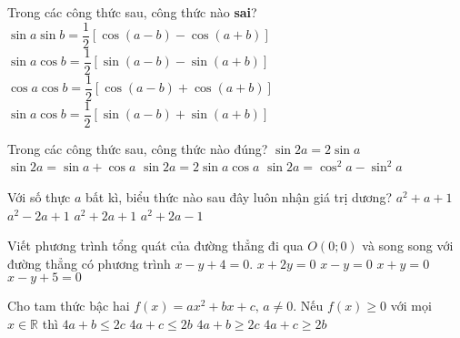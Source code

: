 \begin{ex}%
Trong các công thức sau, công thức nào {\bf sai}?
\choice
{$\sin a\sin b=\dfrac{1}{2}\left[\cos(a-b)-\cos(a+b)\right]$}
{\True $\sin a\cos b=\dfrac{1}{2}\left[\sin(a-b)-\sin(a+b)\right]$}
{$\cos a\cos b=\dfrac{1}{2}\left[\cos(a-b)+\cos(a+b)\right]$}
{$\sin a\cos b=\dfrac{1}{2}\left[\sin(a-b)+\sin(a+b)\right]$}	
\end{ex}

\begin{ex}%
Trong các công thức sau, công thức nào đúng?
\choice
{$\sin2a=2\sin a$}
{$\sin2a=\sin a+\cos a$}
{\True $\sin2a=2\sin a\cos a$}
{$\sin2a=\cos^2a-\sin^2a$}
\end{ex}

\begin{ex}%
Với số thực $a$ bất kì, biểu thức nào sau đây luôn nhận giá trị dương?
\choice
{\True $a^2+a+1$}
{$a^2-2a+1$}
{$a^2+2a+1$}
{$a^2+2a-1$}
	
\end{ex}

\begin{ex}%
Viết phương trình tổng quát của đường thẳng đi qua $O(0;0)$ và song song với đường thẳng có phương trình $x-y+4=0$.
\choice
{$x+2y=0$}
{\True $x-y=0$}
{$x+y=0$}
{$x-y+5=0$}
\end{ex}

\begin{ex}%
Cho tam thức bậc hai $f(x)=ax^2+bx+c,\, a\ne 0$. Nếu $f(x)\ge 0$ với mọi $x\in\mathbb{R}$ thì
\choice
{$4a+b\le 2c$}
{$4a+c\le 2b$}
{$4a+b\ge 2c$}
{\True $4a+c\ge 2b$}
\end{ex}


